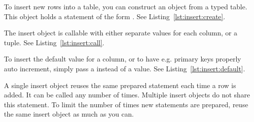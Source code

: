 To insert new rows into a table, you can construct an  object from a typed table. This object holds a statement of the form . See Listing~\ref{lst:insert:create}.



The insert object is callable with either separate values for each column, or a tuple. See Listing~\ref{lst:insert:call}.



To insert the default value for a column, or to have e.g. primary keys properly auto increment, simply pass a  instead of a value. See Listing~\ref{lst:insert:default}.



A single insert object reuses the same prepared statement each time a row is added. It can be called any number of times. Multiple insert objects do not share this statement. To limit the number of times new statements are prepared, reuse the same insert object as much as you can.
